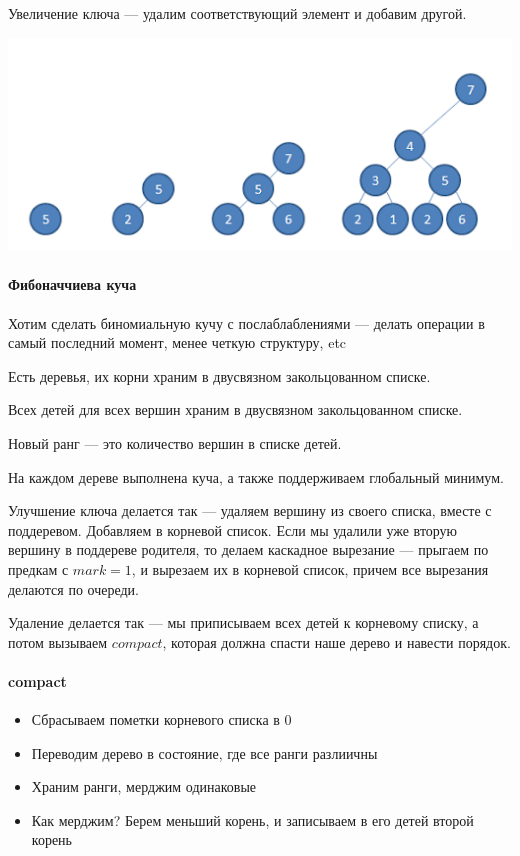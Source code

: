 \documentclass[12pt]{article}
\begin{document}
Увеличение ключа --- удалим соответствующий элемент и добавим другой.

\includegraphics{pictures/binoial_heap.png}

\paragraph{Фибоначчиева куча}
\hspace{\fill}

Хотим сделать биномиальную кучу с послаблаблениями --- делать операции в самый последний момент, менее четкую структуру, etc

Есть деревья, их корни храним в двусвязном закольцованном списке.

Всех детей для всех вершин храним в двусвязном закольцованном списке.

Новый ранг --- это количество вершин в списке детей.

На каждом дереве выполнена куча, а также поддерживаем глобальный минимум.

Улучшение ключа делается так --- удаляем вершину из своего списка, вместе с поддеревом. Добавляем в корневой список. Если мы удалили уже вторую вершину в поддереве родителя, то делаем каскадное вырезание --- прыгаем по предкам с $mark = 1$, и вырезаем их в корневой список, причем все вырезания делаются по очереди.

Удаление делается так --- мы приписываем всех детей к корневому списку, а потом вызываем $compact$, которая должна спасти наше дерево и навести порядок.

\paragraph{compact} 
\begin{itemize}
\item Сбрасываем пометки корневого списка в 0
\item Переводим дерево в состояние, где все ранги разлиичны
\item Храним ранги, мерджим одинаковые
\item Как мерджим? Берем меньший корень, и записываем в его детей второй корень
\end{itemize}
\end{document}
